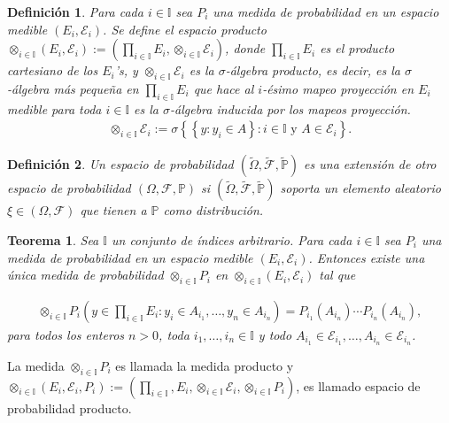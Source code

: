 \documentclass{article}
\newtheorem{Def}{Definición}[section]
\newtheorem{Teo}{Teorema}[section]
\newcommand{\prob}{\mathbb{P}}
\numberwithin{equation}{section}
\begin{document}
\begin{Def}
Para cada $i\in \mathbb{I}$ sea $P_{i}$ una medida de probabilidad en un espacio medible $\left(E_{i},\mathcal{E}_{i}\right)$. Se define el espacio producto $\otimes_{i\in\mathbb{I}}\left(E_{i},\mathcal{E}_{i}\right):=\left(\prod_{i\in\mathbb{I}}E_{i},\otimes_{i\in\mathbb{I}}\mathcal{E}_{i}\right)$, donde $\prod_{i\in\mathbb{I}}E_{i}$ es el producto cartesiano de los $E_{i}$'s, y $\otimes_{i\in\mathbb{I}}\mathcal{E}_{i}$ es la $\sigma$-\'algebra producto, es decir, es la $\sigma$-\'algebra m\'as peque\~na en $\prod_{i\in\mathbb{I}}E_{i}$ que hace al $i$-\'esimo mapeo proyecci\'on en $E_{i}$ medible para toda $i\in\mathbb{I}$ es la $\sigma$-\'algebra inducida por los mapeos proyecci\'on. 
\begin{eqnarray}
\otimes_{i\in\mathbb{I}}\mathcal{E}_{i}:=\sigma\left\{\left\{y:y_{i}\in A\right\}:i\in\mathbb{I}\textrm{ y }A\in\mathcal{E}_{i}\right\}.
\end{eqnarray}
\end{Def}

\begin{Def}
Un espacio de probabilidad $\left(\tilde{\Omega},\tilde{\mathcal{F}},\tilde{\prob}\right)$ es una extensi\'on de otro espacio de probabilidad $\left(\Omega,\mathcal{F},\prob\right)$ si $\left(\tilde{\Omega},\tilde{\mathcal{F}},\tilde{\prob}\right)$ soporta un elemento aleatorio $\xi\in\left(\Omega,\mathcal{F}\right)$ que tienen a $\prob$ como distribuci\'on.
\end{Def}

\begin{Teo}
Sea $\mathbb{I}$ un conjunto de \'indices arbitrario. Para cada $i\in\mathbb{I}$ sea $P_{i}$ una medida de probabilidad en un espacio medible $\left(E_{i},\mathcal{E}_{i}\right)$. Entonces existe una \'unica medida de probabilidad $\otimes_{i\in\mathbb{I}}P_{i}$ en $\otimes_{i\in\mathbb{I}}\left(E_{i},\mathcal{E}_{i}\right)$ tal que 

\begin{eqnarray}
\otimes_{i\in\mathbb{I}}P_{i}\left(y\in\prod_{i\in\mathbb{I}}E_{i}:y_{i}\in A_{i_{1}},\ldots,y_{n}\in A_{i_{n}}\right)=P_{i_{1}}\left(A_{i_{n}}\right)\cdots P_{i_{n}}\left(A_{i_{n}}\right),
\end{eqnarray}
para todos los enteros $n>0$, toda $i_{1},\ldots,i_{n}\in\mathbb{I}$ y todo $A_{i_{1}}\in\mathcal{E}_{i_{1}},\ldots,A_{i_{n}}\in\mathcal{E}_{i_{n}}$.
\end{Teo}

La medida $\otimes_{i\in\mathbb{I}}P_{i}$ es llamada la medida producto y $\otimes_{i\in\mathbb{I}}\left(E_{i},\mathcal{E}_{i},P_{i}\right):=\left(\prod_{i\in\mathbb{I}},E_{i},\otimes_{i\in\mathbb{I}}\mathcal{E}_{i},\otimes_{i\in\mathbb{I}}P_{i}\right)$, es llamado espacio de probabilidad producto.
\end{document}

